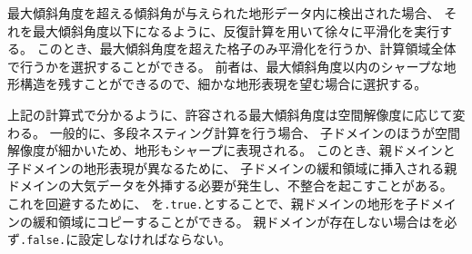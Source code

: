 最大傾斜角度を超える傾斜角が与えられた地形データ内に検出された場合、
それを最大傾斜角度以下になるように、反復計算を用いて徐々に平滑化を実行する。
このとき、最大傾斜角度を超えた格子のみ平滑化を行うか、計算領域全体で行うかを選択することができる。
前者は、最大傾斜角度以内のシャープな地形構造を残すことができるので、細かな地形表現を望む場合に選択する。

上記の計算式で分かるように、許容される最大傾斜角度は空間解像度に応じて変わる。
一般的に、多段ネスティング計算を行う場合、
子ドメインのほうが空間解像度が細かいため、地形もシャープに表現される。
このとき、親ドメインと子ドメインの地形表現が異なるために、
子ドメインの緩和領域に挿入される親ドメインの大気データを外挿する必要が発生し、不整合を起こすことがある。
これを回避するために、
を\verb|.true.|とすることで、親ドメインの地形を子ドメインの緩和領域にコピーすることができる。
親ドメインが存在しない場合はを必ず\verb|.false.|に設定しなければならない。
